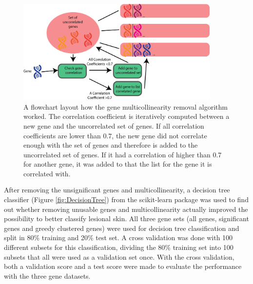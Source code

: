 \documentclass[10pt,a4paper]{article}
\begin{document}
	\begin{figure}[H]
		\includegraphics[width=0.9\textwidth]{GreedyClustering.png}
		\caption{A flowchart layout how the gene multicollinearity removal algorithm worked. The correlation coefficient is iteratively computed between a new gene and the uncorrelated set of genes. If all correlation coefficients are lower than $0.7$, the new gene did not correlate enough with the set of genes and therefore is added to the uncorrelated set of genes. If it had a correlation of higher than 0.7 for another gene, it was added to that the list for the gene it is correlated with.}
		\label{fig:GreedyCorrelationClustering}
	\end{figure}
	
	After removing the unsignificant genes and multicollinearity, a decision tree classifier (Figure \ref{fig:DecisionTree}) from the scikit-learn package was used to find out whether removing unusable genes and multicollinearity actually improved the possibility to better classify lesional skin. All three gene sets (all genes, significant genes and greedy clustered genes) were used for decision tree classification and split in 80\% training and 20\% test set. A cross validation was done with 100 different subsets for this classification, dividing the 80\% training set into 100 subsets that all were used as a validation set once. With the cross validation, both a validation score and a test score were made to evaluate the performance with the three gene datasets.
	
\end{document}

